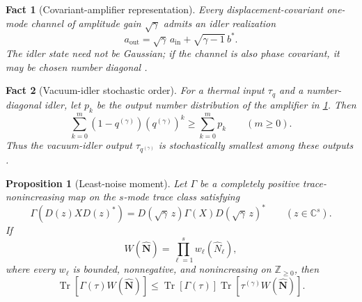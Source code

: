 \documentclass[11pt]{article}
\newtheorem{proposition}[proposition]{Proposition}
\newtheorem{fact}{Fact}[section]
\theoremstyle{remark}
\theoremstyle{plain}
\newcommand{\Tr}{\operatorname{Tr}}
\begin{document}
\begin{fact}[Covariant-amplifier representation]
\label{fact:covariant-amplifier-representation}
Every displacement-covariant one-mode channel of amplitude gain
\(\sqrt\gamma\) admits an idler realization
\[
  a_{\mathrm{out}}
  =\sqrt\gamma\,a_{\mathrm{in}}+\sqrt{\gamma-1}\,b^*.
\]
The idler state need not be Gaussian; if the channel is also phase covariant,
it may be chosen number diagonal
\cite[Sec.~II.C and Appendix; Sec.~III for general gain]
{GutaMatsumoto2006MixedGaussianCloning}.
\end{fact}

\begin{fact}[Vacuum-idler stochastic order]
\label{fact:vacuum-idler-stochastic-order}
For a thermal input \(\tau_q\) and a number-diagonal idler, let \(p_k\) be
the output number distribution of the amplifier in
\cref{fact:covariant-amplifier-representation}.  Then
\[
  \sum_{k=0}^m(1-q^{(\gamma)})(q^{(\gamma)})^k
  \ge \sum_{k=0}^m p_k
  \qquad(m\ge0).
\]
Thus the vacuum-idler output \(\tau_{q^{(\gamma)}}\) is stochastically
smallest among these outputs
\cite[Lem.~2.3 and Sec.~III]{GutaMatsumoto2006MixedGaussianCloning}.
\end{fact}

\begin{proposition}[Least-noise moment]
\label{prop:least-noise-moment}
Let \(\Gamma\) be a completely positive trace-nonincreasing map on the
\(s\)-mode trace class satisfying
\[
  \Gamma(D(z)XD(z)^*)
  =D(\sqrt\gamma\,z)\Gamma(X)D(\sqrt\gamma\,z)^*
  \qquad(z\in\mathbb C^s).
\]
If
\[
  W(\widehat{\mathbf N})
  =\prod_{\ell=1}^s w_\ell(\widehat N_\ell),
\]
where every \(w_\ell\) is bounded, nonnegative, and nonincreasing on
\(\mathbb Z_{\ge0}\), then
\begin{equation}\label{eq:least-noise-moment}
  \Tr[\Gamma(\tau)W(\widehat{\mathbf N})]
  \le\Tr[\Gamma(\tau)]
       \Tr[\tau^{(\gamma)}W(\widehat{\mathbf N})].
\end{equation}
\end{proposition}
\end{document}
